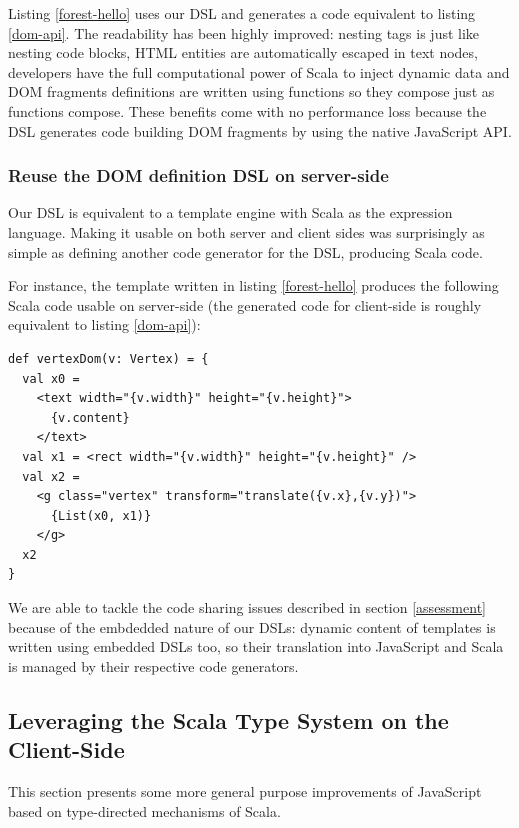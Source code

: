 \documentclass[american,english,runningheads]{llncs}
\begin{document}
Listing \ref{forest-hello} uses our DSL and generates a code equivalent to listing \ref{dom-api}. The readability has
been highly improved: nesting tags is just like nesting code blocks, HTML entities are
automatically escaped in text nodes, developers have the full computational power of Scala to inject dynamic data and
DOM fragments definitions are written using functions so they compose just as functions compose. These benefits come
with no performance loss because the DSL generates code building DOM fragments by using the native JavaScript API.

\subsubsection{Reuse the DOM definition DSL on server-side}

Our DSL is equivalent to a template engine with Scala as the expression language. Making it usable on both server and
client sides was surprisingly as simple as defining another code generator for the DSL, producing Scala code.

For instance, the template written in listing \ref{forest-hello} produces the following Scala code usable on
server-side (the generated code for client-side is roughly equivalent to listing \ref{dom-api}):

\begin{lstlisting}
def vertexDom(v: Vertex) = {
  val x0 =
    <text width="{v.width}" height="{v.height}">
      {v.content}
    </text>
  val x1 = <rect width="{v.width}" height="{v.height}" />
  val x2 =
    <g class="vertex" transform="translate({v.x},{v.y})">
      {List(x0, x1)}
    </g>
  x2
}
\end{lstlisting}

We are able to tackle the code sharing issues described in section \ref{assessment} because of the embdedded nature
of our DSLs: dynamic content of templates is written using embedded DSLs too, so their translation into JavaScript
and Scala is managed by their respective code generators.

\subsection{Leveraging the Scala Type System on the Client-Side}

This section presents some more general purpose improvements of JavaScript based on type-directed mechanisms of
Scala.
\end{document}
